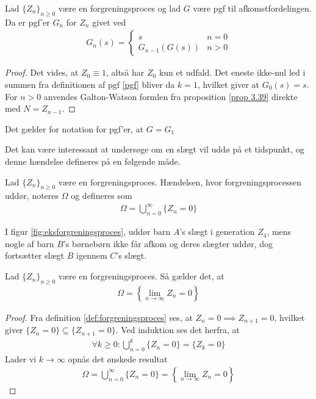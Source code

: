 \begin{prop}\label{prop:pgfforgreningsproces}
Lad $\{Z_n\}_{n\geq 0}$ være en forgreningsproces og lad $G$ være pgf til afkomstfordelingen. Da er pgf'er $G_n$ for $Z_n$ givet ved
\begin{align*}
    G_n(s)=
    \begin{cases}
        s & n=0\\
        G_{n-1}(G(s)) & n>0
    \end{cases}
\end{align*}
\end{prop}
\begin{proof}
Det vides, at $Z_0\equiv 1$, altså har $Z_0$ kun et udfald.
Det eneste ikke-nul led i summen fra definitionen af pgf \ref{pgf} bliver da $k=1$, hvilket giver at $G_0(s)=s$.\\
For $n>0$ anvendes Galton-Watson formlen fra proposition \ref{prop 3.39} direkte med $N = Z_{n - 1}$.
\end{proof}
\begin{rem}
    Det gælder for notation for pgf'er, at $G=G_1$
\end{rem}
Det kan være interessant at undersøge om en slægt vil uddø på et tidspunkt, og denne hændelse defineres på en følgende måde. 
\begin{defn}%
    Lad $\{Z_n\}_{n\geq 0}$ være en forgreningsproces.
    Hændelsen, hvor forgreningsprocessen uddør, noteres $\Omega$ og defineres som
    \begin{align*}
        \Omega = \bigcup_{n=0}^\infty\{Z_n=0\}
    \end{align*}
\end{defn}

I figur \ref{fig:eksforgreningsproces}, uddør barn $A$'s slægt i generation $Z_4$, mens nogle af barn $B$'s børnebørn ikke får afkom og deres slægter uddør, dog fortsætter slægt $B$ igennem $C$'s slægt.

\begin{lem}
    Lad $\{Z_n\}_{n\geq 0}$ være en forgreningsproces. Så gælder det, at
    \begin{align*}
        \Omega = \left\{\lim_{n\rightarrow\infty}Z_n = 0\right\}
    \end{align*}
\end{lem}
\begin{proof}
    Fra definition \ref{def:forgreningsproces} ses, at $Z_n=0\implies Z_{n+1}=0$, hvilket giver $\{Z_n=0\}\subseteq\{Z_{n+1}=0\}$. Ved induktion ses det herfra, at
    \begin{align*}
        \forall k\geq 0:\bigcup_{n=0}^k\{Z_n=0\}=\{Z_{k}=0\}
    \end{align*}
    Lader vi $k\rightarrow\infty$ opnås det ønskede resultat
    \begin{align*}
        \Omega=\bigcup_{n=0}^\infty\{Z_n=0\}=\left\{\lim_{n\rightarrow\infty}Z_n = 0\right\}
    \end{align*}
\end{proof}

